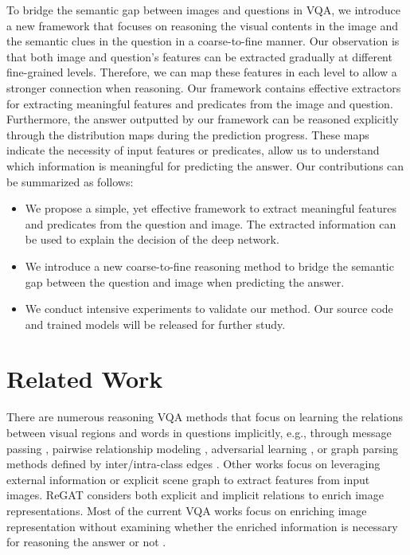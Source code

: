 \documentclass[10pt,twocolumn,letterpaper]{article}
\begin{document}
To bridge the semantic gap between images and questions in VQA, we introduce a new framework that focuses on reasoning the visual contents in the image and the semantic clues in the question in a coarse-to-fine manner. Our observation is that both image and question's features can be extracted gradually at different fine-grained levels. Therefore, we can map these features in each level to allow a stronger connection when reasoning. Our framework contains effective extractors for extracting meaningful features and predicates from the image and question. Furthermore, the answer outputted by our framework can be reasoned explicitly through the distribution maps during the prediction progress. These maps indicate the necessity of input features or predicates, allow us to understand which information is meaningful for predicting the answer. Our contributions can be summarized as follows:
\begin{itemize}
    \item We propose a simple, yet effective framework to extract meaningful features and predicates from the question and image. The extracted information can be used to explain the decision of the deep network.
    
    \item We introduce a new coarse-to-fine reasoning method to bridge the semantic gap between the question and image when predicting the answer.
    
    \item We conduct intensive experiments to validate our method. Our source code and trained models will be released for further study.
\end{itemize}







\section{Related Work}
\label{sec:related_work}
There are numerous reasoning VQA methods \cite{yi2018neuralreasoning,mao2019neuroSupervision,mascharka2018transparency,teney2021unshuffling,urooj2021found,zheng2021knowledge,zheng2020webly,chen2021meta,hong2021transformation, gao2020multi,do2021multiple,wu2019self,amizadeh2020neuro,luo2021just} that focus on learning the relations between visual regions and words in questions implicitly,  e.g., through message passing \cite{teney2017graphvqa}, pairwise relationship modeling \cite{cadene2019murel}, adversarial learning \cite{li2021adversarial,chi2020collaborative,minh2021deform}, or graph parsing methods defined by inter/intra-class edges \cite{gao2019DFAF}. Other works focus on leveraging external information \cite{gu2019externalGraph} or explicit scene graph \cite{chen2019routingGraph} to extract features from input images. ReGAT \cite{li2019regat} considers both explicit and implicit relations to enrich image representations.
Most of the current VQA works focus on enriching image representation without examining whether the enriched information is necessary for reasoning the answer or not \cite{le2020dynamic}. 
\end{document}
